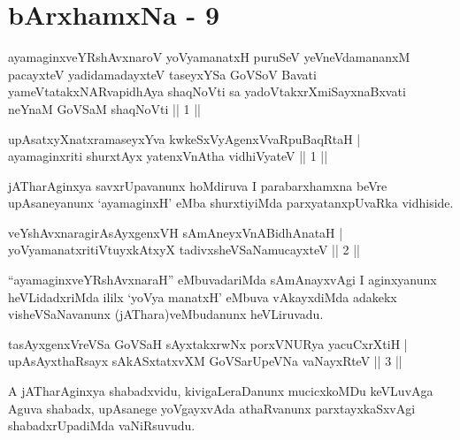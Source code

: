 \chapter{bArxhamxNa - 9}

\begin{kandikeshl}
ayamaginxveYRshAvxnaroV yoV\s yamanatxH puruSeV yeVneVdamananxM pacayxteV yadidamadayxteV taseyxYSa GoVSoV Bavati yameVtatakxNARvapidhAya shaqNoVti sa yadoVtakxrXmiSayxnaBxvati neYnaM GoVSaM shaqNoVti || 1 ||
\end{kandikeshl}


\begin{shl}
upAsatxyXnatxramaseyxYva kwkeSxVyAgenxVvaRpuBaqRtaH | \\
ayamaginxriti shurxtAyx yatenxVnAtha vidhiVyateV \hfill ||  1 || 
\end{shl}

\begin{artha}
jATharAginxya savxrUpavanunx hoMdiruva I parabarxhamxna beVre upAsaneyanunx `ayamaginxH' eMba shurxtiyiMda parxyatanxpUvaRka vidhiside.
\end{artha}


\begin{shl}
veYshAvxnaragirA\s sAyxgenxVH sAmAneyxVnABidhAnataH | \\
yoV\s yamanatxritiVtuyxkAtxyX tadivxsheVSaNamucayxteV \hfill ||  2 || 
\end{shl}

\begin{artha}
``ayamaginxveYRshAvxnaraH'' eMbuvadariMda sAmAnayxvAgi I aginxyanunx heVLidadxriMda ililx `yoV\s ya manatxH' eMbuva vAkayxdiMda adakekx visheVSaNavanunx (jAThara)veMbudanunx heVLiruvadu.
\end{artha}


\begin{shl}
tasAyxgenxVreVSa GoVSaH sAyxtakxrwNx porxVNURya yacuCxrXtiH | \\
upAsAyxthaRsayx sAkASxtatxvXM GoVSarUpeVNa vaNayxRteV \hfill ||  3 || 
\end{shl}

\begin{artha}
A jATharAginxya shabadxvidu, kivigaLeraDanunx mucicxkoMDu keVLuvAga Aguva shabadx, upAsanege yoVgayxvAda athaRvanunx parxtayxkaSxvAgi shabadxrUpadiMda vaNiRsuvudu.
\end{artha}

